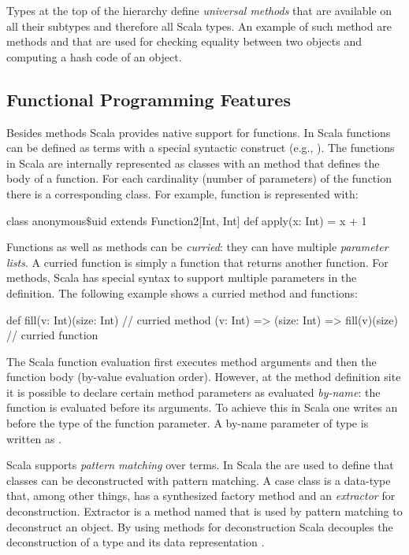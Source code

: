 Types at the top of the hierarchy define \emph{universal methods} that are available
 on all their subtypes and therefore all Scala types. An example of such method are methods
  and  that are used for checking equality between two objects
 and computing a hash code of an object.


\subsection{Functional Programming Features}
\label{functional-programming-features}

Besides methods Scala provides native support for functions. In Scala functions can be defined
as terms with a special syntactic construct (e.g., ). The functions
in Scala are internally represented as classes with an  method that defines
the body of a function. For each cardinality (number of parameters) of the function there is a corresponding
class. For example, function  is represented with:\begin{lstparagraph}
class anonymous$\$$uid extends Function2[Int, Int] {
  def apply(x: Int) = x + 1
}
\end{lstparagraph}

Functions as well as methods can be \emph{curried}: they can have multiple \emph{parameter lists}.
 A curried function is simply a function that returns another function.
 For methods, Scala has special syntax to support multiple parameters in the definition.
 The following example shows a curried method and functions:\begin{lstparagraph}
def fill(v: Int)(size: Int) // curried method
(v: Int) => (size: Int) => fill(v)(size) // curried function
\end{lstparagraph}

The Scala function evaluation first executes method arguments and then
 the function body (by-value evaluation order). However, at the method definition site it
 is possible to declare certain method parameters as evaluated \emph{by-name}: the function
 is evaluated before its arguments. To achieve this in Scala one writes an \code{=>} before
 the type of the function parameter. A by-name parameter of type  is written as
 .


Scala supports \emph{pattern matching} over terms. In Scala the  are
used to define that classes can be deconstructed with pattern matching. A case class is
a data-type that, among other things, has a synthesized factory method  and
an \emph{extractor} for deconstruction. Extractor is a method named  that
is used by pattern matching to deconstruct an object. By using
methods for deconstruction Scala decouples the deconstruction of a type and its
data representation \cite{emir2007matching}.

